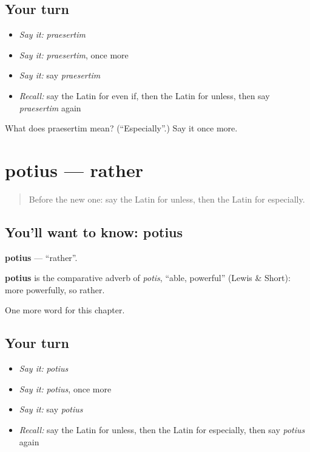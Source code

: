 \subsection*{Your turn}
\begin{itemize}
\raggedright
  \item \emph{Say it:} \emph{praesertim}
  \item \emph{Say it:} \emph{praesertim}, once more
  \item \emph{Say it:} say \emph{praesertim}
  \item \emph{Recall:} say the Latin for even if, then the Latin for unless, then say \emph{praesertim} again
\end{itemize}

\begin{tcolorbox}[breakable,colback=teal!4,colframe=teal!35!black,title={Before you move on}]
What does praesertim mean? (\textquotedblleft{}Especially\textquotedblright{}.) Say it once more.
\end{tcolorbox}
\section[potius]{potius — rather}

\label{lesson:LA-C179-potius}



\begin{quote}
Before the new one: say the Latin for unless, then the Latin for especially.
\end{quote}

\subsection*{You'll want to know: potius}
\textbf{potius} — \textquotedblleft{}rather\textquotedblright{}.

\begin{cousinweb}
\textbf{potius} is the comparative adverb of \emph{potis}, \textquotedblleft{}able, powerful\textquotedblright{} (Lewis \& Short): more powerfully, so rather.
\end{cousinweb}

\begin{grammarlens}[title={What you've built}]
One more word for this chapter.
\end{grammarlens}

\subsection*{Your turn}
\begin{itemize}
\raggedright
  \item \emph{Say it:} \emph{potius}
  \item \emph{Say it:} \emph{potius}, once more
  \item \emph{Say it:} say \emph{potius}
  \item \emph{Recall:} say the Latin for unless, then the Latin for especially, then say \emph{potius} again
\end{itemize}

